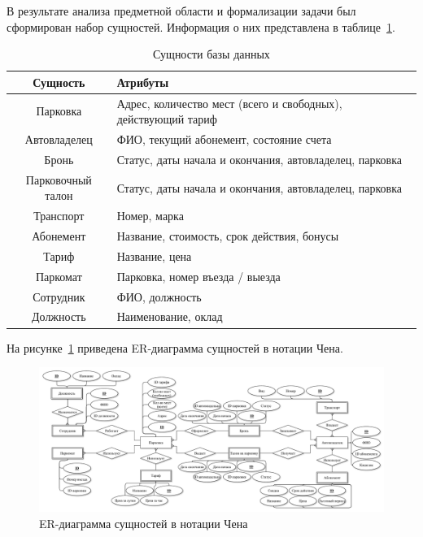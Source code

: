 \label{cha:A-entity}
В результате анализа предметной области и формализации задачи был сформирован набор сущностей.
Информация о них представлена в таблице~\ref{tab:ER}.

\begin{table}[H]
	\begin{center}
		\begin{center}
			\caption{\label{tab:ER}Сущности базы данных}
		\end{center}
		\begin{tabular}{|c|p{10cm}|}
			\hline 
			Сущность & Атрибуты \\ \hline
        Парковка & Адрес, количество мест (всего и свободных), действующий тариф  \\ \hline
        Автовладелец & ФИО, текущий абонемент, состояние счета \\ \hline
        Бронь & Статус, даты начала и окончания, автовладелец, парковка \\ \hline
        Парковочный талон & Статус, даты начала и окончания, автовладелец, парковка \\ \hline
        Транспорт & Номер, марка \\ \hline
        Абонемент & Название, стоимость, срок действия, бонусы \\ \hline
        Тариф & Название, цена \\ \hline
        Паркомат & Парковка, номер въезда / выезда \\ \hline
        Сотрудник & ФИО, должность \\ \hline
        Должность & Наименование, оклад \\ \hline
		\end{tabular}
	\end{center}
\end{table}

На рисунке~\ref{fig:ER_chen} приведена ER-диаграмма сущностей в нотации Чена.
\begin{figure}[h]
	\centering
	\includegraphics[height=0.5\textheight, width=1.4\textwidth, angle=90]{svg/ER_chen}
	\caption{ER-диаграмма сущностей в нотации Чена}
	\label{fig:ER_chen}
\end{figure}

